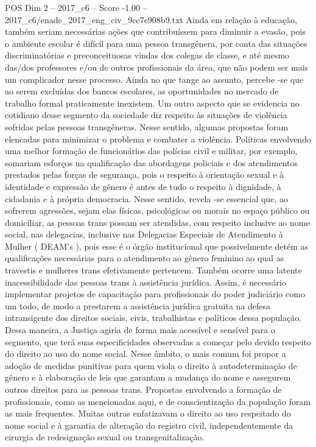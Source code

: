 \begin{textsample}{POS Dim 2 – 2017\_c6 – Score -1.00 – 2017\_c6/enade\_2017\_eng\_civ\_9cc7e908b9.txt}
Ainda em relação à educação, também seriam necessárias ações que contribuíssem para diminuir a evasão, pois o ambiente escolar é difícil para uma pessoa transgênera, por conta das situações discriminatórias e preconceituosas vindas dos colegas de classe, e até mesmo das/dos professores e/ou de outros profissionais da área, que não podem ser mais um complicador nesse processo.
Ainda no que tange ao assunto, percebe -se que ao serem excluídas dos bancos escolares, as oportunidades no mercado de trabalho formal praticamente inexistem.
Um outro aspecto que se evidencia no cotidiano desse segmento da sociedade diz respeito às situações de violência sofridas pelas pessoas transgêneras.
Nesse sentido, algumas propostas foram elencadas para minimizar o problema e combater a violência.
Políticas envolvendo uma melhor formação de funcionários das polícias civil e militar, por exemplo, somariam esforços na qualificação das abordagens policiais e dos atendimentos prestados pelas forças de segurança, pois o respeito à orientação sexual e à identidade e expressão de gênero é antes de tudo o respeito à dignidade, à cidadania e à própria democracia.
Nesse sentido, revela -se essencial que, ao sofrerem agressões, sejam elas físicas, psicológicas ou morais no espaço público ou domiciliar, as pessoas trans possam ser atendidas, com respeito inclusive ao nome social, nas delegacias, inclusive nas Delegacias Especiais de Atendimento à Mulher ( DEAM’s ), pois esse é o órgão institucional que possivelmente detém as qualificações necessárias para o atendimento ao gênero feminino ao qual as travestis e mulheres trans efetivamente pertencem.
Também ocorre uma latente inacessibilidade das pessoas trans à assistência jurídica.
Assim, é necessário implementar projetos de capacitação para profissionais do poder judiciário como um todo, de modo a prestarem a assistência jurídica gratuita na defesa intransigente dos direitos sociais, civis, trabalhistas e políticos dessa população.
Dessa maneira, a Justiça agiria de forma mais acessível e sensível para o segmento, que terá suas especificidades observadas a começar pelo devido respeito do direito ao uso do nome social.
Nesse âmbito, o mais comum foi propor a adoção de medidas punitivas para quem viola o direito à autodeterminação de gênero e à elaboração de leis que garantam a mudança do nome e assegurem outros direitos para as pessoas trans.
Propostas envolvendo a formação de profissionais, como as mencionadas aqui, e de conscientização da população foram as mais frequentes.
Muitas outras enfatizavam o direito ao uso respeitado do nome social e à garantia de alteração do registro civil, independentemente da cirurgia de redesignação sexual ou transgenitalização.

\end{textsample}
